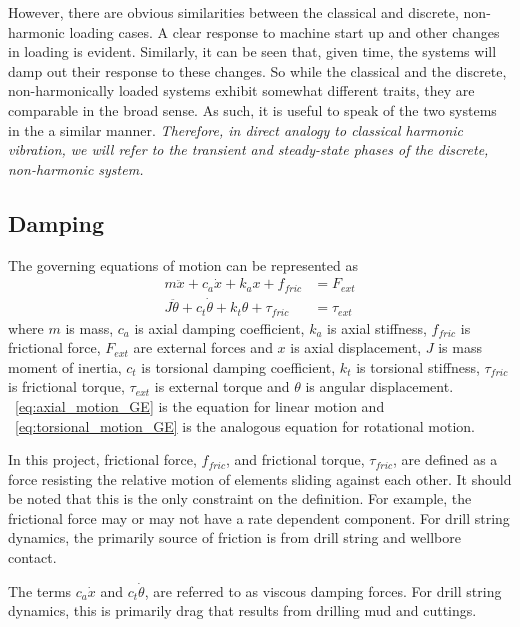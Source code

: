 However, there are obvious similarities between the classical and discrete, non-harmonic loading cases.  A clear response to machine start up and other changes in loading is evident.  Similarly, it can be seen that, given time, the systems will damp out their response to these changes. So while the classical and the discrete, non-harmonically loaded systems exhibit somewhat different traits, they are comparable in the broad sense.  As such, it is useful to speak of the two systems in the a similar manner.  \emph{Therefore, in direct analogy to classical harmonic vibration, we will refer to the transient and steady-state phases of the discrete, non-harmonic system.}

\subsection{Damping}
The governing equations of motion can be represented as
\begin{align}
    m\ddot{x}      + c_a\dot{x}      + k_ax      + f_{fric}    & = F_{ext}    \label{eq:axial_motion_GE} \\
    J\ddot{\theta} + c_t\dot{\theta} + k_t\theta + \tau_{fric} & = \tau_{ext} \label{eq:torsional_motion_GE}
\end{align}
where $m$ is mass, $c_a$ is axial damping coefficient, $k_a$ is axial stiffness, $f_{fric}$ is frictional force, $F_{ext}$ are external forces and $x$ is axial displacement, $J$ is mass moment of inertia, $c_t$ is torsional damping coefficient, $k_t$ is torsional stiffness, $\tau_{fric}$ is frictional torque, $\tau_{ext}$ is external torque and $\theta$ is angular displacement.  \equationname~\ref{eq:axial_motion_GE} is the equation for linear motion and \equationname~\ref{eq:torsional_motion_GE} is the analogous equation for rotational motion.
 
In this project, frictional force, $f_{fric}$, and frictional torque, $\tau_{fric}$, are defined as a force resisting the relative motion of elements sliding against each other.  It should be noted that this is the only constraint on the definition.  For example, the frictional force may or may not have a rate dependent component.  For drill string dynamics, the primarily source of friction is from drill string and wellbore contact.


The terms $c_a\dot{x}$ and $c_t\dot{\theta}$, are referred to as viscous damping forces.  For drill string dynamics, this is primarily drag that results from drilling mud and cuttings.

